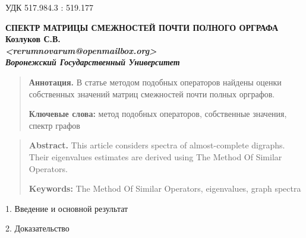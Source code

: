 \documentclass[12pt,a4paper]{article}
\theoremstyle{definition}
\theoremstyle{plain}
\theoremstyle{remark}
\begin{document}
\setcounter{thm}{0}
\setcounter{lemma}{0}
\quad УДК 517.984.3 : 519.177

\begin{center}
%
\vskip0.5cm
\textbf{СПЕКТР МАТРИЦЫ СМЕЖНОСТЕЙ ПОЧТИ ПОЛНОГО ОРГРАФА}\\
\vskip0.5cm
\textbf{
    \textbf{Козлуков С.В.\footnotemark} \\
    \textit{<rerumnovarum@openmailbox.org>} \\
    \textit{Воронежский Государственный Университет}
}
\end{center}


\begin{quote}
    \small{{\bf Аннотация.}
    В статье методом подобных операторов найдены оценки собственных значений
    матриц смежностей почти полных орграфов.
    }

    \textbf{Ключевые слова:}
    \small{метод подобных операторов, собственные значения, спектр графов}
\end{quote}

\begin{quote}
    \small{{\bf Abstract.}
    This article considers spectra of almost-complete digraphs.
    Their eigenvalues estimates are derived using The Method Of Similar Operators.
    }

    \textbf{Keywords:}
    \small{The Method Of Similar Operators, eigenvalues, graph spectra}
\end{quote}

\begin{center}{1. Введение и основной результат}\end{center}

\begin{center}{2. Доказательство}\end{center}




\end{document}
